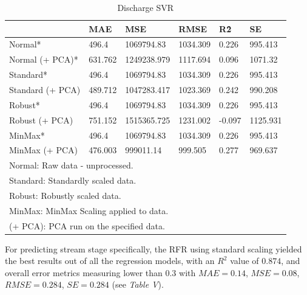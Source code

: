 \documentclass[conference]{IEEEtran}
\begin{document}
\begin{table}[H]
    \caption{Discharge SVR}
    \begin{adjustbox}{width=\columnwidth,center}
    \centering
    \begin{tabular}{llllll}
        ~ & MAE & MSE & RMSE & R\^2 & SE \\ \hline
        Normal* & 496.4 & 1069794.83 & 1034.309 & 0.226 & 995.413 \\ 
        Normal (+ PCA)* & 631.762 & 1249238.979 & 1117.694 & 0.096 & 1071.32 \\ 
        Standard* & 496.4 & 1069794.83 & 1034.309 & 0.226 & 995.413 \\ 
        Standard (+ PCA) & 489.712 & 1047283.417 & 1023.369 & 0.242 & 990.208 \\ 
        Robust*  & 496.4 & 1069794.83 & 1034.309 & 0.226 & 995.413 \\ 
        Robust (+ PCA) & 751.152 & 1515365.725 & 1231.002 & -0.097 & 1125.931 \\ 
        MinMax*  & 496.4 & 1069794.83 & 1034.309 & 0.226 & 995.413 \\ 
        MinMax (+ PCA) & 476.003 & 999011.14 & 999.505 & 0.277 & 969.637 \\ 
        \bottomrule
        \multicolumn{6}{l}{\footnotesize *Normal: Raw data - unprocessed.}\\
        \multicolumn{6}{l}{\footnotesize *Standard: Standardly scaled data.}\\
        \multicolumn{6}{l}{\footnotesize *Robust: Robustly scaled data.}\\
        \multicolumn{6}{l}{\footnotesize *MinMax: MinMax Scaling applied to data.}\\
        \multicolumn{6}{l}{\footnotesize *(+ PCA): PCA run on the specified data.}\\
    \end{tabular}
    \end{adjustbox}
\end{table}

For predicting stream stage specifically, the RFR using standard scaling yielded the best results out of all the regression models, with an $R^2$ value of $0.874$, and overall error metrics measuring lower than $0.3$ with $MAE = 0.14$, $MSE = 0.08$, $RMSE = 0.284$, $SE = 0.284$ (see \textit{Table V}).
\end{document}
